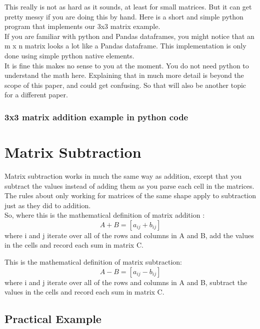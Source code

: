 \documentclass{article}
\begin{document}
\vspace{2pc}
\newpage
This really is not as hard as it sounds, at least for small matrices. But it can get pretty messy if you are doing this by hand.
Here is a short and simple python program that implements our 3x3 matrix example.
\\
If you are familiar with python and Pandas dataframes, you might notice that an m x n matrix looks a lot like a Pandas dataframe.
This implementation is only done using simple python native elements.
\\It is fine this makes no sense to you at the moment.  You do not need python to understand the math here. 
Explaining that in much more detail is beyond the scope of this paper, and could get confusing.  So that will also be another topic for a different paper.
\subsubsection{3x3 matrix addition example in python code}


\newpage
\section{Matrix Subtraction}
Matrix subtraction works in much the same way as addition, except that you subtract the values instead of adding them as you parse each cell in the matrices.
The rules about only working for matrices of the same shape apply to subtraction just as they did to addition.
\\
So, where this is the mathematical definition of matrix addition :
\\
\begin{equation*}
  A + B = [a_{ij} + b_{ij}] 
\end{equation*}
where i and j iterate over all of the rows and columns in A and B, add the values in the cells and record each sum in matrix C.

\vspace{2pc}
This is the mathematical definition of matrix subtraction:
\\
\begin{equation*}
  A - B = [a_{ij} - b_{ij}] 
\end{equation*}
where i and j iterate over all of the rows and columns in A and B, subtract the values in the cells and record each sum in matrix C.

\subsection{Practical Example}
\end{document}
